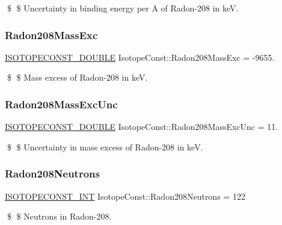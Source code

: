 \$ \$ Uncertainty in binding energy per A of Radon-\/208 in keV. \mbox{\label{group___isotope_const-_radon-_rn208_ga7fc07bbd12522d786e0d1f5152efed9d}} 
\subsubsection{\texorpdfstring{Radon208\+Mass\+Exc}{Radon208MassExc}}
{\footnotesize\ttfamily \mbox{\hyperlink{group___isotope_const-_macros_ga8f45a7272ce02c0b4c65c44636ed719a}{I\+S\+O\+T\+O\+P\+E\+C\+O\+N\+S\+T\+\_\+\+D\+O\+U\+B\+LE}} Isotope\+Const\+::\+Radon208\+Mass\+Exc = -\/9655.}

\$ \$ Mass excess of Radon-\/208 in keV. \mbox{\label{group___isotope_const-_radon-_rn208_gab82d425cad5b6e71d7320a7381f5f30f}} 
\subsubsection{\texorpdfstring{Radon208\+Mass\+Exc\+Unc}{Radon208MassExcUnc}}
{\footnotesize\ttfamily \mbox{\hyperlink{group___isotope_const-_macros_ga8f45a7272ce02c0b4c65c44636ed719a}{I\+S\+O\+T\+O\+P\+E\+C\+O\+N\+S\+T\+\_\+\+D\+O\+U\+B\+LE}} Isotope\+Const\+::\+Radon208\+Mass\+Exc\+Unc = 11.}

\$ \$ Uncertainty in mass excess of Radon-\/208 in keV. \mbox{\label{group___isotope_const-_radon-_rn208_ga1beb8de729930000d7cee94d12ff6606}} 
\subsubsection{\texorpdfstring{Radon208\+Neutrons}{Radon208Neutrons}}
{\footnotesize\ttfamily \mbox{\hyperlink{group___isotope_const-_macros_ga5f18360b3e99483a35c32d789e62621c}{I\+S\+O\+T\+O\+P\+E\+C\+O\+N\+S\+T\+\_\+\+I\+NT}} Isotope\+Const\+::\+Radon208\+Neutrons = 122}

\$ \$ Neutrons in Radon-\/208. \mbox{\label{group___isotope_const-_radon-_rn208_gad416d10c27da69f4113194531696e911}} 
